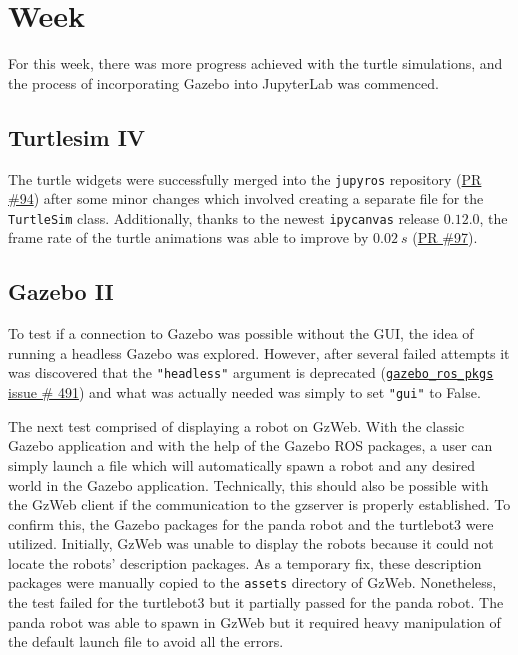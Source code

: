 \chapter{Week}

    For this week, there was more progress achieved with the turtle simulations, and the process of incorporating Gazebo into JupyterLab was commenced. 

\section{Turtlesim IV}
    
    The turtle widgets were successfully merged into the \texttt{jupyros} repository (\href{https://github.com/RoboStack/jupyter-ros/pull/94}{PR \#94}) after some minor changes which involved creating a separate file for the \texttt{TurtleSim} class. Additionally, thanks to the newest \texttt{ipycanvas} release $0.12.0$, the frame rate of the turtle animations was able to improve by $0.02\ s$ (\href{https://github.com/RoboStack/jupyter-ros/pull/97}{PR \#97}). 


\section{Gazebo II}

    To test if a connection to Gazebo was possible without the GUI, the idea of running a headless Gazebo was explored. However, after several failed attempts it was discovered that the \texttt{"headless"} argument is deprecated (\href{https://github.com/ros-simulation/gazebo_ros_pkgs/issues/491}{\texttt{gazebo\_ros\_pkgs} issue \# 491}) and what was actually needed was simply to set \texttt{"gui"} to False.

    The next test comprised of displaying a robot on GzWeb. With the classic Gazebo application and with the help of the Gazebo ROS packages, a user can simply launch a file which will automatically spawn a robot and any desired world in the Gazebo application. Technically, this should also be possible with the GzWeb client if the communication to the gzserver is properly established. To confirm this, the Gazebo packages for the panda robot and the turtlebot3 were utilized. Initially, GzWeb was unable to display the robots because it could not locate the robots' description packages. As a temporary fix, these description packages were manually copied to the \texttt{assets} directory of GzWeb. Nonetheless, the test failed for the turtlebot3 but it partially passed for the panda robot. The panda robot was able to spawn in GzWeb but it required heavy manipulation of the default launch file to avoid all the errors.
    
